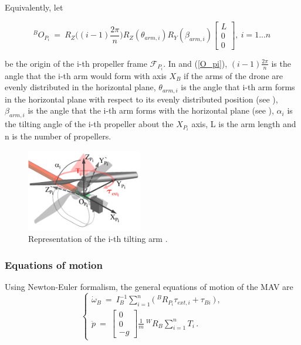 Equivalently, let

\begin{equation}
  \label{O_pi}
  ^{B}O_{P_{i}} \ = \ R_{Z}\bigg((i-1)\frac{2\pi}{n}\bigg) R_Z(\theta_{arm,i}) R_Y(\beta_{arm,i})
  \begin{bmatrix}
    L \\
    0 \\
    0
  \end{bmatrix}
  ,\   i = 1...n \,
\end{equation}

be the origin of the i-th propeller frame  $\mathcal{F}_{P_{i}}$.
In  and (\ref{O_pi}), $(i-1)\frac{2\pi}{n}$ is the angle that
the i-th arm would form with axis $X_B$ if the arms of the drone are evenly
distributed in the horizontal plane, $\theta_{arm,i}$ is the angle that i-th arm forms
in the horizontal plane with respect to its evenly distributed position
(see ), $\beta_{arm,i}$ is the angle that the i-th arm forms with
the horizontal plane (see ), $\alpha_{i}$ is the tilting
angle of the i-th propeller about the $X_{P_{i}}$ axis, L is the arm length and
n is the number of propellers.

\begin{figure}[!h]
  \centering
  \includegraphics[width=0.45\textwidth]{images/tilt_model.png}
  \caption{Representation of the i-th tilting arm \citep{ryll_modeling_2012}.}
  \label{fig:tilt_model}
\end{figure}

\subsubsection{Equations of motion}
\label{sec:equations}
Using Newton-Euler formalism, the general equations of motion of the MAV are
\begin{equation}
  \label{acc_eq}
  \begin{cases}
    \dot{\omega}_B  \ = \ I_B^{-1} \sum_{i=1}^{n}  \big(\ ^{B}R_{P_{i}} \tau_{ext,i} + \tau_{Bi} \ \big) \, ,\\
    \ddot{p}  \ = \
    \begin{bmatrix}
      0 \\
      0 \\
      -g
    \end{bmatrix}
    \frac{1}{m} \ ^{W}R_B \sum_{i=1}^{n} T_i \, .
  \end{cases}
\end{equation}

